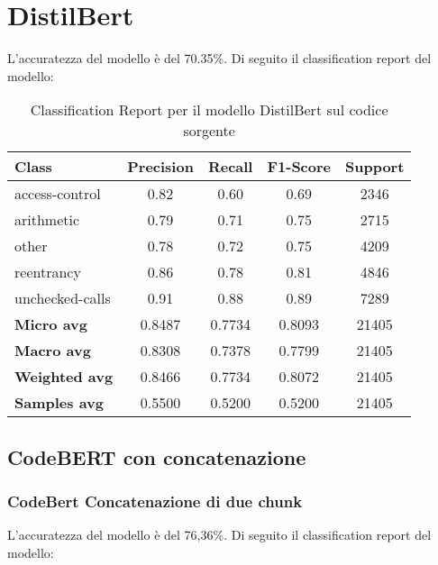 \documentclass[../../Thesis.tex]{subfiles}
\begin{document}
\section{DistilBert}
L'accuratezza del modello è del 70.35\%. Di seguito il classification report del modello:

\begin{table}[H]
    \centering
    \small
    \begin{tabular}{lcccc}
    \hline
    \textbf{Class} & \textbf{Precision} & \textbf{Recall} & \textbf{F1-Score} & \textbf{Support} \\
    \hline
    access-control & 0.82 & 0.60 & 0.69 & 2346 \\
    arithmetic & 0.79 & 0.71 & 0.75 & 2715 \\
    other & 0.78 & 0.72 & 0.75 & 4209 \\
    reentrancy & 0.86 & 0.78 & 0.81 & 4846 \\
    unchecked-calls & 0.91 & 0.88 & 0.89 & 7289 \\
    \hline
    \textbf{Micro avg} & 0.8487 & 0.7734 & 0.8093 & 21405 \\
    \textbf{Macro avg} & 0.8308 & 0.7378 & 0.7799 & 21405 \\
    \textbf{Weighted avg} & 0.8466 & 0.7734 & 0.8072 & 21405 \\
    \textbf{Samples avg} & 0.5500 & 0.5200 & 0.5200 & 21405 \\
    \hline
    \end{tabular}
    \caption{Classification Report per il modello DistilBert sul codice sorgente}
\end{table}

\subsection{CodeBERT con concatenazione}
\subsubsection{CodeBert Concatenazione di due chunk}
L'accuratezza del modello è del 76,36\%. Di seguito il classification report del modello:
\end{document}
